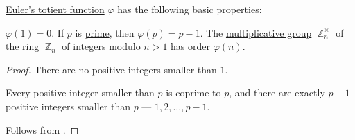 \begin{proposition}\label{thm:def:eulers_totient_function}
  \hyperref[def:eulers_totient_function]{Euler's totient function} \( \varphi \) has the following basic properties:
  \begin{thmenum}
     \( \varphi(1) = 0 \).
     If \( p \) is \hyperref[def:prime_number]{prime}, then \( \varphi(p) = p - 1 \).
     The \hyperref[def:semiring]{multiplicative group} \( \BbbZ_n^\times \) of the ring \hyperref[def:ring_of_integers_modulo]{\( \BbbZ_n \)} of integers modulo \( n > 1 \) has order \( \varphi(n) \).
  \end{thmenum}
\end{proposition}
\begin{proof}
   There are no positive integers smaller than \( 1 \).

   Every positive integer smaller than \( p \) is coprime to \( p \), and there are exactly \( p - 1 \) positive integers smaller than \( p \) --- \( 1, 2, \ldots, p - 1 \).

   Follows from .
\end{proof}


